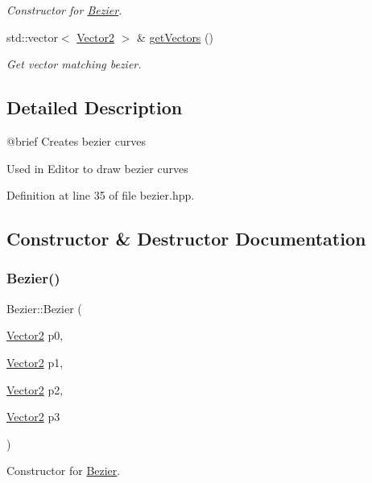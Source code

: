 \begin{DoxyCompactItemize}
\begin{DoxyCompactList}\small\item\em Constructor for \mbox{\hyperlink{classBezier}{Bezier}}. \end{DoxyCompactList}\item 
std\+::vector$<$ \mbox{\hyperlink{classVector2}{Vector2}} $>$ \& \mbox{\hyperlink{classBezier_a26bf332b0c831e0f302f1d72ec782436}{get\+Vectors}} ()
\begin{DoxyCompactList}\small\item\em Get vector matching bezier. \end{DoxyCompactList}\end{DoxyCompactItemize}


\subsection{Detailed Description}
@brief Creates bezier curves

Used in Editor to draw bezier curves 

Definition at line 35 of file bezier.\+hpp.



\subsection{Constructor \& Destructor Documentation}
\mbox{\label{classBezier_aeee0e41ed64d1a61d7ac103d2300093b}} 
\subsubsection{\texorpdfstring{Bezier()}{Bezier()}\hspace{0.1cm}{\footnotesize\ttfamily [1/2]}}
{\footnotesize\ttfamily Bezier\+::\+Bezier (\begin{DoxyParamCaption}\item[{\mbox{\hyperlink{classVector2}{Vector2}}}]{p0,  }\item[{\mbox{\hyperlink{classVector2}{Vector2}}}]{p1,  }\item[{\mbox{\hyperlink{classVector2}{Vector2}}}]{p2,  }\item[{\mbox{\hyperlink{classVector2}{Vector2}}}]{p3 }\end{DoxyParamCaption})}



Constructor for \mbox{\hyperlink{classBezier}{Bezier}}. 


